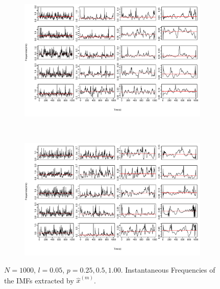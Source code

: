 \documentclass[11pt, a4paper]{article} %
\begin{document}
\begin{figure}
\begin{subfigure}{1.1\textwidth}
  \centering
  \includegraphics[width=\linewidth]{IF_N1000_l005_m1_5.pdf}
  \label{fig:sfig1}
\end{subfigure}\\
\begin{subfigure}{1.1\textwidth}
  \centering
  \includegraphics[width=\linewidth]{IF_N1000_l005_m6_10.pdf}
  \label{fig:sfig2}
\end{subfigure}
\label{fig1}
\caption{$N = 1000$, $l = 0.05$, $p = 0.25, 0.5, 1.00$. Instantaneous Frequencies of the IMFs extracted by $\hat{x}^{(m)}$.}
\end{figure}

\restoregeometry



\end{document}
